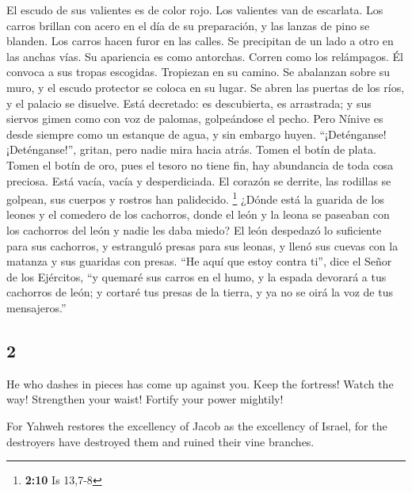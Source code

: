 \begin{paracol}{2}
 El escudo de sus valientes es de color rojo. Los
valientes van de escarlata. Los carros brillan con acero en el día de su
preparación, y las lanzas de pino se blanden.  Los carros
hacen furor en las calles. Se precipitan de un lado a otro en las anchas
vías. Su apariencia es como antorchas. Corren como los relámpagos.
 Él convoca a sus tropas escogidas. Tropiezan en su
camino. Se abalanzan sobre su muro, y el escudo protector se coloca en
su lugar.  Se abren las puertas de los ríos, y el palacio
se disuelve.  Está decretado: es descubierta, es
arrastrada; y sus siervos gimen como con voz de palomas, golpeándose el
pecho.  Pero Nínive es desde siempre como un estanque de
agua, y sin embargo huyen. ``¡Deténganse! ¡Deténganse!'', gritan, pero
nadie mira hacia atrás.  Tomen el botín de plata. Tomen el
botín de oro, pues el tesoro no tiene fin, hay abundancia de toda cosa
preciosa.  Está vacía, vacía y desperdiciada. El corazón
se derrite, las rodillas se golpean, sus cuerpos y rostros han
palidecido. \footnote{\textbf{2:10} Is 13,7-8}  ¿Dónde
está la guarida de los leones y el comedero de los cachorros, donde el
león y la leona se paseaban con los cachorros del león y nadie les daba
miedo?  El león despedazó lo suficiente para sus
cachorros, y estranguló presas para sus leonas, y llenó sus cuevas con
la matanza y sus guaridas con presas.  ``He aquí que
estoy contra ti'', dice el Señor de los Ejércitos, ``y quemaré sus
carros en el humo, y la espada devorará a tus cachorros de león; y
cortaré tus presas de la tierra, y ya no se oirá la voz de tus
mensajeros.''

\switchcolumn
\begin{otherlanguage}{english}

\hypertarget{section-3}{%
\section{2}\label{section-3}}

 He who dashes in pieces has come up against you. Keep the
fortress! Watch the way! Strengthen your waist! Fortify your power
mightily!

 For Yahweh restores the excellency of Jacob as the
excellency of Israel, for the destroyers have destroyed them and ruined
their vine branches.


\end{otherlanguage}
\end{paracol}
